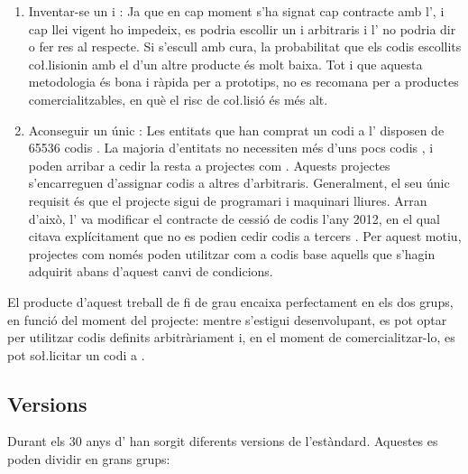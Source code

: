 \begin{enumerate}
    \item Inventar-se un  i : Ja que en cap moment s'ha
    signat cap contracte amb l', i cap llei vigent ho impedeix, es
    podria escollir un  i  arbitraris i l' no
    podria dir o fer res al respecte. Si s'escull amb cura, la
    probabilitat que els codis escollits co\l.lisionin amb el d'un altre
    producte és molt baixa. Tot i que aquesta metodologia és bona i ràpida per a
    prototips, no es recomana per a productes comercialitzables, en què el risc
    de co\l.lisió és més alt.
    \item Aconseguir un únic : Les entitats que han comprat un codi
     a l' disposen de
    \num[round-mode=places,round-precision=0]{65536} codis . La majoria
    d'entitats no necessiten més d'uns pocs codis , i poden arribar
    a cedir la resta a projectes com  \cite{OpenMokoUSB}. Aquests
    projectes s'encarreguen d'assignar codis  a altres d'arbitraris.
    Generalment, el seu únic requisit és que el projecte sigui de programari
    i maquinari lliures. Arran d'això, l' va modificar el contracte
    de cessió de codis  l'any 2012, en el qual citava explícitament que no es
    podien cedir codis  a tercers \cite{Johnson2023usb}. Per aquest
    motiu, projectes com  només poden utilitzar com a codis
     base aquells que s'hagin adquirit abans d'aquest canvi
    de condicions.
\end{enumerate}

El producte d'aquest treball de fi de grau encaixa perfectament en els dos
grups, en funció del moment del projecte: mentre s'estigui desenvolupant, es
pot optar per utilitzar codis definits arbitràriament i, en el moment de
comercialitzar-lo, es pot so\l.licitar un codi  a .

\subsection{Versions}
\label{sec:usb_versions}

Durant els 30 anys d' han sorgit diferents versions de
l'estàndard. Aquestes es poden dividir en grans grups:

